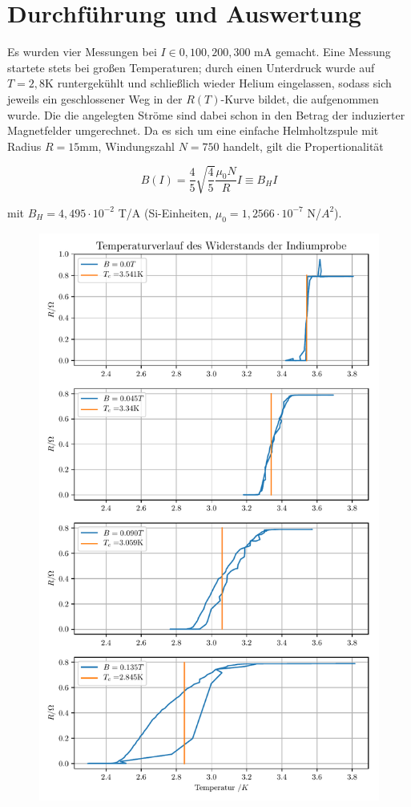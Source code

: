 \section{Durchführung und Auswertung}

Es wurden vier Messungen bei $I \in {0,100,200,300}$ mA gemacht. Eine Messung startete stets bei großen Temperaturen; durch einen Unterdruck wurde auf $T=2,8$K runtergekühlt und schließlich wieder Helium eingelassen, sodass sich jeweils ein geschlossener Weg in der $R(T)$-Kurve bildet, die aufgenommen wurde. Die die angelegten Ströme sind dabei schon in den Betrag der induzierter Magnetfelder umgerechnet. Da es sich um eine einfache Helmholtzspule mit Radius $R=15$mm, Windungszahl $N=750$ handelt, gilt die Propertionalität

\begin{equation}
B(I) = \frac{4}{5}\sqrt{\frac{4}{5}} \frac{\mu_0 N}{R} I \equiv B_H I
\end{equation}

mit $B_H = 4,495 \cdot 10^{-2}$ T/A (Si-Einheiten, $\mu_0 = 1,2566\cdot 10^{-7}$ N/$A^2$).

\begin{figure}[h]
\includegraphics[width=\textwidth]{Temperaturverlauf_des_Widerstands_der_Indiumprobe.pdf}
\end{figure}

